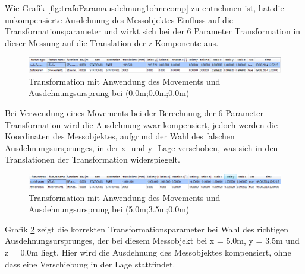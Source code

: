 Wie Grafik \ref{fig:trafoParamausdehnung1ohnecomp} zu entnehmen ist, hat die unkompensierte Ausdehnung des Messobjektes Einfluss auf die Transformationsparameter und wirkt sich bei der 6 Parameter Transformation in dieser Messung auf die Translation der z Komponente aus.

\begin{figure}[h]
\label{fig:trafoParamausdehnung1}
\centering
	\includegraphics[scale=1.7]{bilder/Testmessung/ursprungecke/trafoParamausdehnung1}
	\caption{Transformation mit Anwendung des Movements und Ausdehnungsursprung bei (0.0m;0.0m;0.0m)}
\end{figure}

Bei Verwendung eines Movements bei der Berechnung der 6 Parameter Transformation wird die Ausdehnung zwar kompensiert, jedoch werden die Koordinaten des Messobjektes, aufgrund der Wahl des falschen Ausdehnungsursprunges, in der x- und y- Lage verschoben, was sich in den Translationen der Transformation widerspiegelt.

\begin{figure}[h]
\label{fig:trafoParamausdehnung1ausdurspr}
\centering
	\includegraphics[scale=1.7]{bilder/Testmessung/ursprungecke/trafoParamausdehnung1ausdurspr}
	\caption{Transformation mit Anwendung des Movements und Ausdehnungsursprung bei (5.0m;3.5m;0.0m)}
\end{figure}

Grafik \ref{fig:trafoParamausdehnung1ausdurspr} zeigt die korrekten Transformationsparameter bei Wahl des richtigen Ausdehnungsursprunges, der bei diesem Messobjekt bei x = 5.0m, y = 3.5m und z = 0.0m liegt. Hier wird die Ausdehnung des Messobjektes kompensiert, ohne dass eine Verschiebung in der Lage stattfindet.

